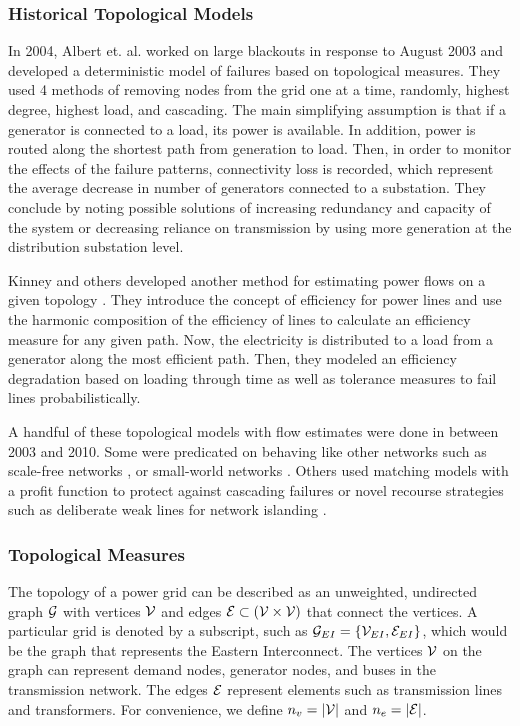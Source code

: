 \subsubsection{Historical Topological Models}
In 2004, Albert et. al. \cite{albert_2004} worked on large blackouts in response to August 2003 and developed a deterministic model of failures based on topological measures.  They used 4 methods of removing nodes from the grid one at a time, randomly, highest degree, highest load, and cascading.  The main simplifying assumption is that if a generator is connected to a load, its power is available.  In addition, power is routed along the shortest path from generation to load.  Then, in order to monitor the effects of the failure patterns, connectivity loss is recorded, which represent the average decrease in number of generators connected to a substation.  They conclude by noting possible solutions of increasing redundancy and capacity of the system or decreasing reliance on transmission by using more generation at the distribution substation level.

Kinney and others developed another method for estimating power flows on a given topology \cite{kinney_2005}.  They introduce the concept of efficiency for power lines and use the harmonic composition of the efficiency of lines to calculate an efficiency measure for any given path.  Now, the electricity is distributed to a load from a generator along the most efficient path.  Then, they modeled an efficiency degradation based on loading through time as well as tolerance measures to fail lines probabilistically.

A handful of these topological models with flow estimates were done in between 2003 and 2010.  Some were predicated on behaving like other networks such as scale-free networks \cite{zhao_2004}, \cite{wang_2009} or small-world networks \cite{ding_2006}.  Others used matching models with a profit function to protect against cascading failures \cite{sun_2008} or novel recourse strategies such as deliberate weak lines for network islanding \cite{duenas-osorio_2009}. 

\subsubsection{Topological Measures}

The topology of a power grid can be described as an unweighted, undirected graph $\mathcal{G}$ with vertices $\mathcal{V}$ and edges $\mathcal{E} \subset (\mathcal{V} \times \mathcal{V})$ that connect the vertices.  A particular grid is denoted by a subscript, such as $\mathcal{G}_{EI} = \left\{ \mathcal{V}_{EI}, \mathcal{E}_{EI} \right\}$, which would be the graph that represents the Eastern Interconnect.  The vertices $\mathcal{V}$ on the graph can represent demand nodes, generator nodes, and buses in the transmission network.  The edges $\mathcal{E}$ represent elements such as transmission lines and transformers.  For convenience, we define $n_v = \left| \mathcal{V} \right|$ and $n_e = \left| \mathcal{E} \right|$.

